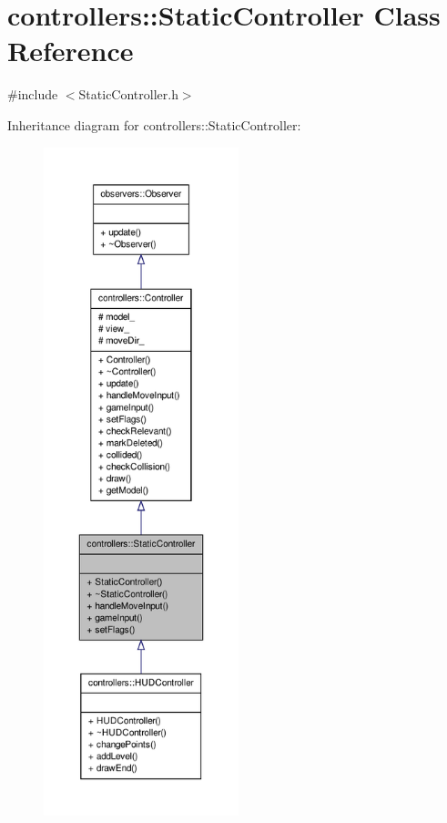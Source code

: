 \hypertarget{classcontrollers_1_1StaticController}{\section{controllers\-:\-:\-Static\-Controller \-Class \-Reference}
\label{d7/dbb/classcontrollers_1_1StaticController}
}


{\ttfamily \#include $<$\-Static\-Controller.\-h$>$}



\-Inheritance diagram for controllers\-:\-:\-Static\-Controller\-:\nopagebreak
\begin{figure}[H]
\begin{center}
\leavevmode
\includegraphics[height=550pt]{d8/db2/classcontrollers_1_1StaticController__inherit__graph}
\end{center}
\end{figure}


